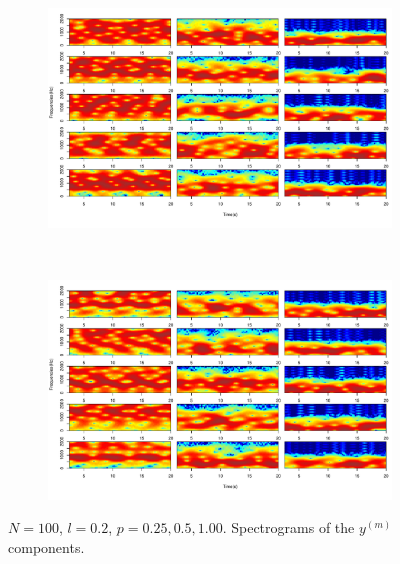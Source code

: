 \documentclass[11pt, a4paper]{article} %
\begin{document}
\begin{figure}
\begin{subfigure}{1.1\textwidth}
  \centering
  \includegraphics[width=\linewidth]{spectro_N100_l020_y_m_1_5.pdf}
  \label{fig:sfig1}
\end{subfigure}\\
\begin{subfigure}{1.1\textwidth}
  \centering
  \includegraphics[width=\linewidth]{spectro_N100_l020_y_m_6_10.pdf}
  \label{fig:sfig2}
\end{subfigure}
\label{fig1}
\caption{$N = 100$, $l = 0.2$, $p = 0.25, 0.5, 1.00$. Spectrograms of the $y^{(m)}$ components.}
\end{figure}

\restoregeometry


\end{document}
